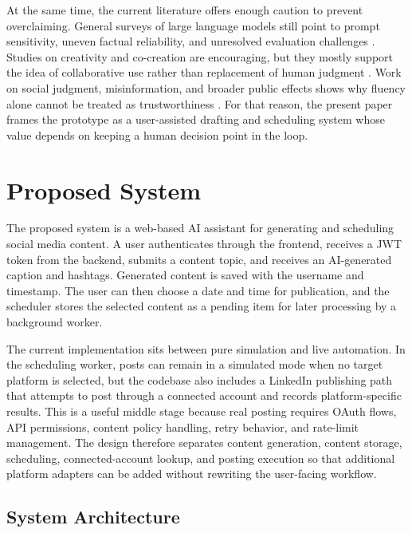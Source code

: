 \documentclass[conference]{IEEEtran}
\begin{document}
At the same time, the current literature offers enough caution to prevent overclaiming. General surveys of large language models still point to prompt sensitivity, uneven factual reliability, and unresolved evaluation challenges \cite{kumar2024llm}. Studies on creativity and co-creation are encouraging, but they mostly support the idea of collaborative use rather than replacement of human judgment \cite{hubert2024,mcguire2024}. Work on social judgment, misinformation, and broader public effects shows why fluency alone cannot be treated as trustworthiness \cite{mittelstadt2024,govindankutty2024,kudina2025}. For that reason, the present paper frames the prototype as a user-assisted drafting and scheduling system whose value depends on keeping a human decision point in the loop.

\section{Proposed System}

The proposed system is a web-based AI assistant for generating and scheduling social media content. A user authenticates through the frontend, receives a JWT token from the backend, submits a content topic, and receives an AI-generated caption and hashtags. Generated content is saved with the username and timestamp. The user can then choose a date and time for publication, and the scheduler stores the selected content as a pending item for later processing by a background worker.

The current implementation sits between pure simulation and live automation. In the scheduling worker, posts can remain in a simulated mode when no target platform is selected, but the codebase also includes a LinkedIn publishing path that attempts to post through a connected account and records platform-specific results. This is a useful middle stage because real posting requires OAuth flows, API permissions, content policy handling, retry behavior, and rate-limit management. The design therefore separates content generation, content storage, scheduling, connected-account lookup, and posting execution so that additional platform adapters can be added without rewriting the user-facing workflow.

\subsection{System Architecture}
\end{document}
